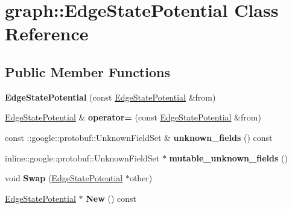 \hypertarget{classgraph_1_1EdgeStatePotential}{
\section{graph::EdgeStatePotential Class Reference}
\label{classgraph_1_1EdgeStatePotential}
}
\subsection*{Public Member Functions}
\begin{DoxyCompactItemize}
\item 
\hypertarget{classgraph_1_1EdgeStatePotential_a07c6b74b96e49c9dd58dd6801d331734}{
{\bfseries EdgeStatePotential} (const \hyperlink{classgraph_1_1EdgeStatePotential}{EdgeStatePotential} \&from)}
\label{classgraph_1_1EdgeStatePotential_a07c6b74b96e49c9dd58dd6801d331734}

\item 
\hypertarget{classgraph_1_1EdgeStatePotential_aa84be9ac7930900ea711dd50c61a992c}{
\hyperlink{classgraph_1_1EdgeStatePotential}{EdgeStatePotential} \& {\bfseries operator=} (const \hyperlink{classgraph_1_1EdgeStatePotential}{EdgeStatePotential} \&from)}
\label{classgraph_1_1EdgeStatePotential_aa84be9ac7930900ea711dd50c61a992c}

\item 
\hypertarget{classgraph_1_1EdgeStatePotential_aa3d87d59c31b9583a2723bf7d838b7e8}{
const ::google::protobuf::UnknownFieldSet \& {\bfseries unknown\_\-fields} () const }
\label{classgraph_1_1EdgeStatePotential_aa3d87d59c31b9583a2723bf7d838b7e8}

\item 
\hypertarget{classgraph_1_1EdgeStatePotential_ade01e66023e544434ec77933186df507}{
inline::google::protobuf::UnknownFieldSet $\ast$ {\bfseries mutable\_\-unknown\_\-fields} ()}
\label{classgraph_1_1EdgeStatePotential_ade01e66023e544434ec77933186df507}

\item 
\hypertarget{classgraph_1_1EdgeStatePotential_ae27775781654c45f108db1186e4702a7}{
void {\bfseries Swap} (\hyperlink{classgraph_1_1EdgeStatePotential}{EdgeStatePotential} $\ast$other)}
\label{classgraph_1_1EdgeStatePotential_ae27775781654c45f108db1186e4702a7}

\item 
\hypertarget{classgraph_1_1EdgeStatePotential_a6f0a8292d587a2275ec9ea0d329ff02c}{
\hyperlink{classgraph_1_1EdgeStatePotential}{EdgeStatePotential} $\ast$ {\bfseries New} () const }
\label{classgraph_1_1EdgeStatePotential_a6f0a8292d587a2275ec9ea0d329ff02c}


\end{DoxyCompactItemize}
